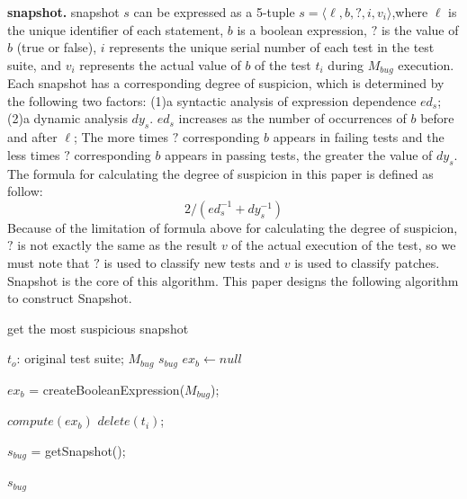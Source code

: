 \documentclass[sn-basic]{sn-jnl}
\theoremstyle{thmstyleone}
\theoremstyle{thmstyletwo}
\theoremstyle{thmstylethree}
\begin{document}
\textbf{snapshot.} snapshot $s$ can be expressed as a 5-tuple $s= \langle \ell,b,?,i,v_i \rangle$,where $\ell$ is the unique identifier of each statement, $b$ is a boolean expression, $?$ is the value of $b$ (true or false), $i$ represents the unique serial number of each test in the test suite, and $v_i$ represents the actual value of $b$ of the test $t_i$ during $M_{bug}$ execution. Each snapshot has a corresponding degree of suspicion, which is determined by the following two factors: (1)a syntactic analysis of expression dependence $ed_s$; (2)a dynamic analysis $dy_s$. $ed_s$ increases as the number of occurrences of $b$ before and after $\ell$; The more times $?$ corresponding $b$ appears in failing tests and the less times $?$ corresponding $b$ appears in passing tests, the greater the value of $dy_s$. The formula for calculating the degree of suspicion in this paper is defined as follow:
\begin{equation}
	2/({ed_s^{-1}}+dy_s^{-1})
\end{equation}
Because of the limitation of formula above for calculating the degree of suspicion, $?$ is not exactly the same as the result $v$ of the actual execution of the test, so we must note that $?$ is used to classify new tests and $v$ is used to classify patches. Snapshot is the core of this algorithm. This paper designs the following algorithm to construct Snapshot.
\begin{algorithm}
	\caption{get the most suspicious snapshot}\label{algo1}
	\begin{algorithmic}[1]
	\Require
	$t_o$: original test suite;
	$M_{bug}$
	\Ensure
	 $s_{bug}$
	\State $ex_b \gets null$
	
	\State $ex_b$ = createBooleanExpression($M_{bug}$);
	
	
	
	 \State $compute(ex_b)$
	\Else \State $delete(t_i)$;
	\EndIf
	\EndFor
	
	\State $s_{bug}$ = getSnapshot();
	
	\Return $s_{bug}$
	\EndFunction
	\end{algorithmic}
\end{algorithm}
\end{document}
